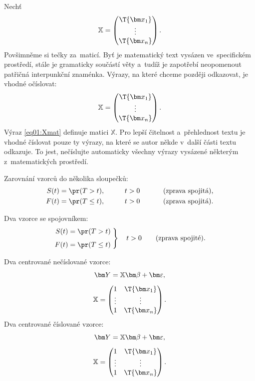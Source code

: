 Nechť
\[   %
	\mathbb{X} = \begin{pmatrix}
								 \T{\bm x_1} \\
								 \vdots      \\
								 \T{\bm x_n}
	\end{pmatrix}.
\]
Povšimněme si tečky za~maticí. Byť je matematický text vysázen
ve~specifickém prostředí, stále je gramaticky součástí věty a~tudíž je
zapotřebí neopomenout patřičná interpunkční znaménka. Výrazy, na které
chceme později odkazovat, je vhodné očíslovat:
\begin{equation}
	\label{eq01:Xmat}
	\mathbb{X} = \begin{pmatrix}
								 \T{\bm x_1} \\
								 \vdots      \\
								 \T{\bm x_n}
	\end{pmatrix}.
\end{equation}
Výraz \eqref{eq01:Xmat} definuje matici $\mathbb{X}$. Pro lepší čitelnost
a~přehlednost textu je vhodné číslovat pouze ty výrazy, na které se
autor někde v~další části textu odkazuje. To jest, nečíslujte
automaticky všechny výrazy vysázené některým z~matematických
prostředí.

Zarovnání vzorců do několika sloupečků:
\begin{alignat*}{3}
	S(t) &= \pr(T > t),    &\qquad t&>0       &\qquad&\text{ (zprava spojitá),}\\
	F(t) &= \pr(T \leq t), &\qquad t&>0       &\qquad&\text{ (zprava spojitá).}
\end{alignat*}

Dva vzorce se spojovníkem:
\begin{equation}
	\label{eq01:FS}
	\left.
	\begin{aligned}
		S(t) &= \pr(T > t) \\[1ex]
		F(t) &= \pr(T \leq t)
	\end{aligned}
	\;  %
	\right\}
	\quad t>0 \qquad \text{(zprava spojité).}
\end{equation}

Dva centrované nečíslované vzorce:
\begin{gather*}
	\bm Y = \mathbb{X}\bm\beta + \bm\varepsilon, \\[1ex]
	\mathbb{X} = \begin{pmatrix}
								 1 & \T{\bm x_1} \\ \vdots & \vdots \\ 1 &
								 \T{\bm x_n}
	\end{pmatrix}.
\end{gather*}
Dva centrované číslované vzorce:
\begin{gather}
	\bm Y = \mathbb{X}\bm\beta + \bm\varepsilon, \label{eq02:Y}\\[1ex]
	\mathbb{X} = \begin{pmatrix}
								 1 & \T{\bm x_1} \label{eq03:X} \\ \vdots & \vdots \\ 1 &
								 \T{\bm x_n}
	\end{pmatrix}.
\end{gather}

